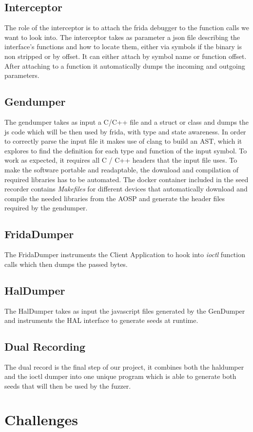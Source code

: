 \documentclass[a4paper,11pt,oneside]{report}
\begin{document}
\section{Interceptor}
The role of the interceptor is to attach the frida debugger to the function calls we want to look into.
The interceptor takes as parameter a json file describing
the interface's functions and how to locate them, either via symbols if the binary is non stripped or by offset.
It can either attach by symbol name or function offset.
After attaching to a function it automatically dumps the incoming and outgoing parameters.
\section{Gendumper}
The gendumper takes as input a C/C++ file and a struct or class and dumps the js code which will be then used by frida, with type and state awareness. In order to correctly parse the input file it makes use of clang to build an
AST, which it explores to find the definition for each type and function of the input symbol. To work as
expected, it requires all C / C++ headers that the input file uses. To make the software portable and readaptable, the download and compilation of required libraries has to be automated. The docker container included in the seed recorder contains \emph{Makefiles} for different devices that automatically download and compile the needed libraries from the AOSP and generate the header files required by the gendumper.
\section{FridaDumper}
The FridaDumper instruments the Client Application to hook into \emph{ioctl} function calls which then dumps
the passed bytes.
\section{HalDumper}
The HalDumper takes as input the javascript files generated by the GenDumper and instruments the HAL interface to generate seeds at runtime.
\section{Dual Recording}
The dual record is the final step of our project, it combines both the haldumper and the ioctl dumper into one unique program which is able to generate both seeds that will then be used by the fuzzer.

\chapter{Challenges}
\end{document}
